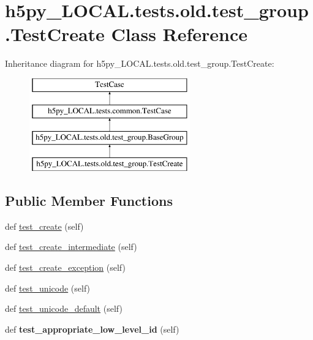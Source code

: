 \hypertarget{classh5py__LOCAL_1_1tests_1_1old_1_1test__group_1_1TestCreate}{}\section{h5py\+\_\+\+L\+O\+C\+A\+L.\+tests.\+old.\+test\+\_\+group.\+Test\+Create Class Reference}
\label{classh5py__LOCAL_1_1tests_1_1old_1_1test__group_1_1TestCreate}
Inheritance diagram for h5py\+\_\+\+L\+O\+C\+A\+L.\+tests.\+old.\+test\+\_\+group.\+Test\+Create\+:\begin{figure}[H]
\begin{center}
\leavevmode
\includegraphics[height=4.000000cm]{classh5py__LOCAL_1_1tests_1_1old_1_1test__group_1_1TestCreate}
\end{center}
\end{figure}
\subsection*{Public Member Functions}
\begin{DoxyCompactItemize}
\item 
def \hyperlink{classh5py__LOCAL_1_1tests_1_1old_1_1test__group_1_1TestCreate_a94e8f33d7e4ab36694115abb8592176b}{test\+\_\+create} (self)
\item 
def \hyperlink{classh5py__LOCAL_1_1tests_1_1old_1_1test__group_1_1TestCreate_a31aa38cab15253b7e871917d063b1fae}{test\+\_\+create\+\_\+intermediate} (self)
\item 
def \hyperlink{classh5py__LOCAL_1_1tests_1_1old_1_1test__group_1_1TestCreate_a1f88d24afd48f0615f9bca28babf80d8}{test\+\_\+create\+\_\+exception} (self)
\item 
def \hyperlink{classh5py__LOCAL_1_1tests_1_1old_1_1test__group_1_1TestCreate_abc97a753292f834b95d517b213eb0213}{test\+\_\+unicode} (self)
\item 
def \hyperlink{classh5py__LOCAL_1_1tests_1_1old_1_1test__group_1_1TestCreate_a0c13621dab8fc5edbfb04f450a011d71}{test\+\_\+unicode\+\_\+default} (self)
\item 
\mbox{\label{classh5py__LOCAL_1_1tests_1_1old_1_1test__group_1_1TestCreate_a53e421041173af3d4b3c153ef45ab68b}} 
def {\bfseries test\+\_\+appropriate\+\_\+low\+\_\+level\+\_\+id} (self)
\end{DoxyCompactItemize}
